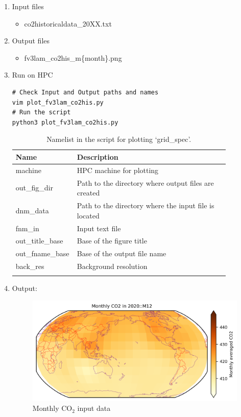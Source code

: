 \documentclass[11pt,fleqn]{report}              %
\begin{document}
\begin{enumerate}
\item Input files
\begin{itemize}
\item co2historicaldata\_20XX.txt
\end{itemize}
\item Output files
\begin{itemize}
\item fv3lam\_co2his\_m\{month\}.png
\end{itemize}
\item Run on HPC

\lstset{language=bash}   
\begin{lstlisting}[frame=trBL]
# Check Input and Output paths and names
vim plot_fv3lam_co2his.py
# Run the script
python3 plot_fv3lam_co2his.py
\end{lstlisting}

{
\fontsize{10}{12}\selectfont
\begin{longtable}{ p{0.17\linewidth} | p{0.7\linewidth} }
\hline
\hline
 Name & Description \\
\hline
 machine & HPC machine for plotting \\
 out\_fig\_dir & Path to the directory where output files are created \\
 dnm\_data & Path to the directory where the input file is located   \\
 fnm\_in & Input text file \\
 out\_title\_base & Base of the figure title \\
 out\_fname\_base & Base of the output file name \\
 back\_res & Background resolution \\
\hline
\caption{Namelist in the script for plotting `grid\_spec'.}
\label{table:fv3_var_gridspec}
\end{longtable}
}


\item Output:

\begin{figure}[ht!]
  \centering
  \includegraphics[width=0.5\linewidth]{fv3_co2his_m12.png}
  \caption{Monthly CO$_2$ input data}
  \label{fig:py_fv3_co2his}
\end{figure}

\end{enumerate}
\end{document}
